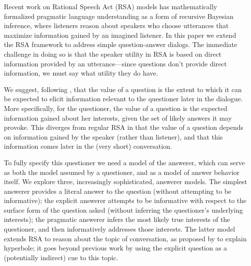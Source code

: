 \documentclass[12pt, floatsintext, man]{apa6}
\begin{document}

Recent work on Rational Speech Act (RSA) models \cite{FrankGoodman12_PragmaticReasoningLanguageGames, GoodmanStuhlmuller13_KnowledgeImplicature} has mathematically formalized pragmatic language understanding as a form of recursive Bayesian inference, where listeners reason about speakers who choose utterances that maximize information gained by an imagined listener.
In this paper we extend the RSA framework to address simple question-answer dialogs.
The immediate challenge in doing so is that the speaker utility in RSA is based on direct information provided by an utterance---since questions don't provide direct information, we must say what utility they do have. 

We suggest, following , that the value of a question is the extent to which it can be expected to elicit information relevant to the questioner later in the dialogue. 
More specifically, for the questioner, the value of a question is the expected information gained about her interests, given the set of likely answers it may provoke. 
This diverges from regular RSA in that the value of a question depends on information gained by the speaker (rather than listener), and that this information comes later in the (very short) conversation.

To fully specify this questioner we need a model of the answerer, which can serve as both the model assumed by a questioner, and as a model of answer behavior itself. We explore three, increasingly sophisticated, answerer models. The simplest answerer provides a literal answer to the question (without attempting to be informative);   
the explicit answerer attempts to be informative with respect to the surface form of the question asked (without inferring the questioner's underlying interests);  
the pragmatic answerer infers the most likely true interests of the questioner, and then informatively addresses those interests.
The latter model extends RSA to reason about the topic of conversation, as proposed by  to explain hyperbole; it goes beyond previous work by using the explicit question as a (potentially indirect) cue to this topic. 
\end{document}
